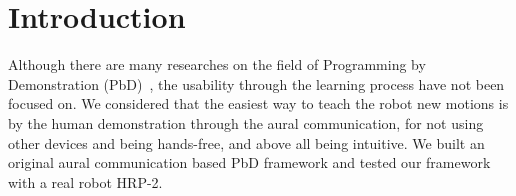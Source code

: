 \section{Introduction}
Although there are many researches on the field of Programming by Demonstration (PbD)~\cite{PbD_bimanual_assembly}\cite{PbD_HMM}, the usability through the learning process have not been focused on. We considered that the easiest way to teach the robot new motions is by the human demonstration through the aural communication, for not using other devices and being hands-free, and above all being intuitive. We built an original aural communication based PbD framework and tested our framework with a real robot HRP-2.
